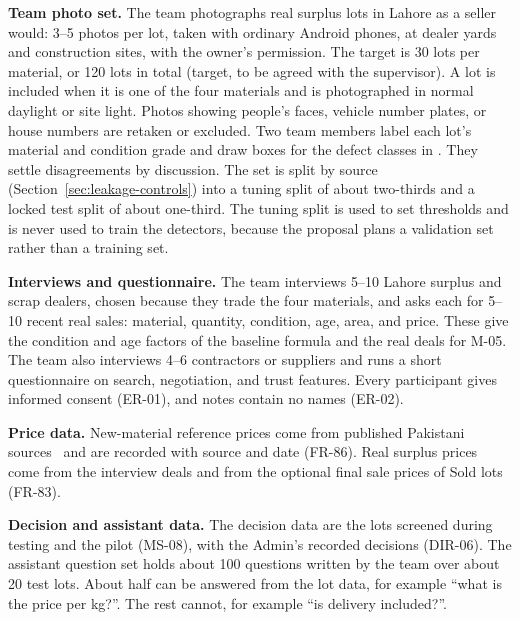\textbf{Team photo set.} The team photographs real surplus lots in Lahore as a seller
would: 3--5 photos per lot, taken with ordinary Android phones, at dealer yards and
construction sites, with the owner's permission. The target is 30 lots per material,
or 120 lots in total (target, to be agreed with the supervisor). A lot is included when
it is one of the four materials and is photographed in normal daylight or site light.
Photos showing people's faces, vehicle number plates, or house numbers are retaken or
excluded. Two team members label each lot's material and condition grade and draw
boxes for the defect classes in . They settle disagreements
by discussion. The set is split by source (Section~\ref{sec:leakage-controls}) into a
tuning split of about two-thirds and a locked test split of about one-third. The tuning
split is used to set thresholds and is never used to train the detectors, because the
proposal plans a validation set rather than a training set.

\textbf{Interviews and questionnaire.} The team interviews 5--10 Lahore surplus and
scrap dealers, chosen because they trade the four materials, and asks each for 5--10
recent real sales: material, quantity, condition, age, area, and price. These give the
condition and age factors of the baseline formula and the real deals for M-05. The team
also interviews 4--6 contractors or suppliers and runs a short questionnaire on search,
negotiation, and trust features. Every participant gives informed consent (ER-01), and
notes contain no names (ER-02).

\textbf{Price data.} New-material reference prices come from published Pakistani
sources~\citep{iconssteelrate,toolsfluentcost2026,thenewscosts2026,zameenprices,graanaprices}
and are recorded with source and date (FR-86). Real surplus prices come from the
interview deals and from the optional final sale prices of Sold lots (FR-83).

\textbf{Decision and assistant data.} The decision data are the lots screened during
testing and the pilot (MS-08), with the Admin's recorded decisions (DIR-06). The
assistant question set holds about 100 questions written by the team over about 20
test lots. About half can be answered from the lot data, for example ``what is the
price per kg?''. The rest cannot, for example ``is delivery included?''.


